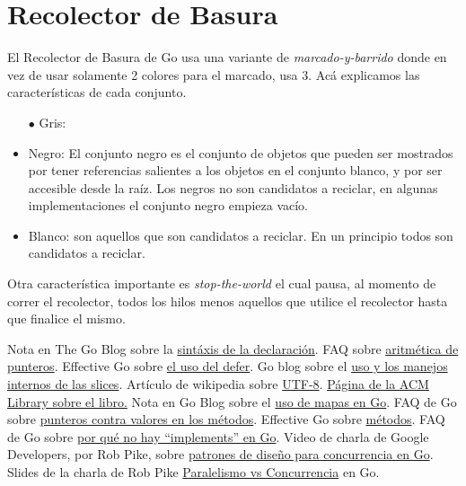 \documentclass{article}
\begin{document}
\section{Recolector de Basura}
El Recolector de Basura de Go usa una variante de \textit{marcado-y-barrido} donde en vez de usar solamente 2 colores para el marcado, usa 3. 
Acá explicamos las características de cada conjunto.
\begin{itemize}
	\item[$\bullet$] Gris:
	\item Negro: El conjunto negro es el conjunto de objetos que pueden ser mostrados por tener referencias salientes a los objetos en el conjunto blanco, y por ser accesible desde la raíz. Los negros no son candidatos a reciclar, en algunas implementaciones el conjunto negro empieza vacío. 
	\item Blanco: son aquellos que son candidatos a reciclar. En un principio todos son candidatos a reciclar. 
\end{itemize}

Otra característica importante es \textit{stop-the-world} el cual pausa, al momento de correr el recolector, todos los hilos menos aquellos que utilice el recolector hasta que finalice el mismo. 
\newpage
\begin{thebibliography}{99}
 Nota en The Go Blog sobre la \href{http://blog.golang.org/gos-declaration-syntax}{sintáxis de la declaración}.
 FAQ sobre \href{https://golang.org/doc/faq#no_pointer_arithmetic}{aritmética de punteros}.
 Effective Go sobre \href{https://golang.org/doc/effective_go.html#defer}{el uso del defer}.
 Go blog sobre el \href{http://blog.golang.org/go-slices-usage-and-internals}{uso y los manejos internos de las slices}.
 Artículo de wikipedia sobre \href{https://es.wikipedia.org/wiki/UTF-8}{UTF-8}.
 \href{http://dl.acm.org/citation.cfm?id=1243380}{Página de la ACM Library sobre el libro.}
 Nota en Go Blog sobre el  \href{http://blog.golang.org/go-maps-in-action}{uso de mapas en Go}.
 FAQ de Go sobre \href{http://golang.org/doc/faq#methods_on_values_or_pointers}{punteros contra valores en los métodos}.
 Effective Go sobre \href{https://golang.org/doc/effective_go.html#methods}{métodos}.
 FAQ de Go sobre \href{https://golang.org/doc/faq#implements_interface}{por qué no hay ``implements'' en Go}.
 Video de charla de Google Developers, por Rob Pike, sobre \href{https://www.youtube.com/watch?v=f6kdp27TYZs}{patrones de diseño para concurrencia en Go}.
 Slides de la charla de Rob Pike \href{http://talks.golang.org/2012/waza.slide#45}{Paralelismo vs Concurrencia} en Go.
\end{thebibliography}
\end{document}
